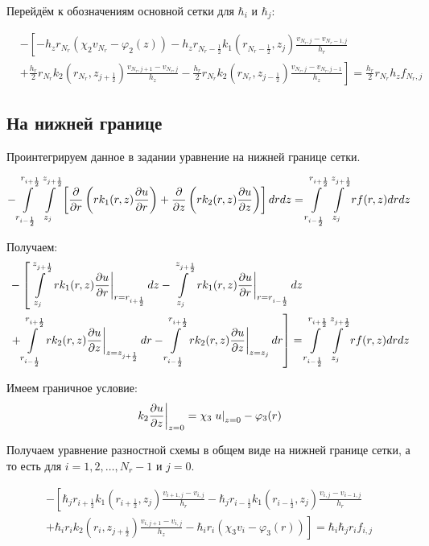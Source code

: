 Перейдём к обозначениям основной сетки для $ \hbar_i $ и $ \hbar_j $:

\begin{align*}
  &- \left [ 
  -h_z r_{N_r} ( \chi_2 v_{N_r} - \varphi_2(z))
  - h_z r_{N_r-\frac{1}{2}} k_1(r_{N_r-\frac{1}{2}}, z_j) \frac{v_{N_r, j} - v_{N_r - 1, j}}{h_{r}}
  \right . \\
  &\left .
  + \frac{h_r}{2} r_{N_r} k_2(r_{N_r}, z_{j+\frac{1}{2}}) \frac{v_{N_r, j + 1} - v_{N_r, j}}{h_{z}}
  - \frac{h_r}{2} r_{N_r} k_2(r_{N_r}, z_{j-\frac{1}{2}}) \frac{v_{N_r, j} - v_{N_r, j - 1}}{h_z}
  \right ]  = \frac{h_r}{2} r_{N_r} h_z f_{N_r, j}
\end{align*}

\subsection{На нижней границе}
Проинтегрируем данное в задании уравнение на нижней границе сетки.

\[
  - \int\limits^{r_{i +\frac{1}{2}}}_{r_{i -\frac{1}{2}}} \int\limits^{z_{j +\frac{1}{2}}}_{z_{j }} \left [ \pdv{}{r} \left ( r k_1(r, z) \pdv{u}{r} \right ) 
  + \pdv{}{z} \left ( rk_2(r, z)\pdv{u}{z} \right ) \right ] drdz = \int\limits^{r_{i +\frac{1}{2}}}_{r_{i -\frac{1}{2}}} \int\limits^{z_{j +\frac{1}{2}}}_{z_{j }} rf(r, z) dr dz
\]

Получаем:
\begin{align*}
  &- \left [
   \int\limits^{z_{j +\frac{1}{2}}}_{z_{j }}  \left . r k_1(r, z) \pdv{u}{r} \right \vert_{r = r_{i + \frac{1}{2}}} dz
  - \int\limits^{z_{j +\frac{1}{2}}}_{z_{j }} \left . r k_1(r, z) \pdv{u}{r} \right \vert_{r = r_{i - \frac{1}{2}}} dz
  \right . \\
  &\left . + \int\limits^{r_{i+\frac{1}{2}}}_{r_{i-\frac{1}{2}}} \left . rk_2(r, z)\pdv{u}{z} \right \vert_{z = z_{j + \frac{1}{2}}} dr
  - \int\limits^{r_{i+\frac{1}{2}}}_{r_{i-\frac{1}{2}}} \left . rk_2(r, z)\pdv{u}{z} \right \vert_{z = z_{j}} dr
  \right ] = \int\limits^{r_{i +\frac{1}{2}}}_{r_{i -\frac{1}{2}}} \int\limits^{z_{j +\frac{1}{2}}}_{z_{j }} rf(r, z) dr dz
\end{align*}

Имеем граничное условие:
\[
  \left . k_2 \pdv{u}{z} \right \vert_{z=0} = \chi_3 \left . u \right \vert_{z=0} - \varphi_3(r)
\]

Получаем уравнение разностной схемы в общем виде на нижней границе сетки, а то есть
для $ i = 1,2, \dots, N_r-1 $ и $ j = 0 $.

\begin{align*}
  - \left [ 
  \hbar_j r_{i+\frac{1}{2}} k_1(r_{i+\frac{1}{2}}, z_j) \frac{v_{i+1, j} - v_{i, j}}{h_{r}}
  - \hbar_j r_{i-\frac{1}{2}} k_1(r_{i-\frac{1}{2}}, z_j) \frac{v_{i, j} - v_{i - 1, j}}{h_{r}}
  \right . \\
  \left .
  + \hbar_i r_{i} k_2(r_i, z_{j+\frac{1}{2}}) \frac{v_{i, j + 1} - v_{i, j}}{h_{z}}
  - \hbar_i r_i (\chi_3 v_i - \varphi_3(r))
  \right ]  = \hbar_i \hbar_j r_i f_{i, j}
\end{align*}

